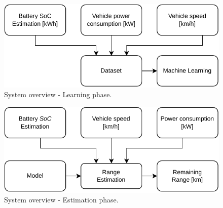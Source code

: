 \begin{figure}[H]
    \begin{center}
        \includegraphics[scale=1.0]{../figures/generic_diagram_learn_phase}
        \caption{System overview - Learning phase.}
    \end{center}
\end{figure}

\begin{figure}[H]
    \begin{center}
        \includegraphics[scale=1.0]{../figures/generic_diagram_estimation_phase}
        \caption{System overview - Estimation phase.}
    \end{center}
\end{figure}